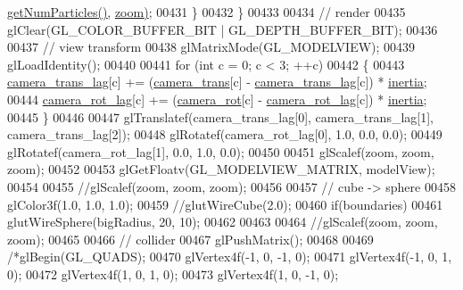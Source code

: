 \begin{DoxyCode}
{{{{{{{      \hyperlink{class_particle_system_a6f89e8d4c3e3e328088b7d652cee84b0}{getNumParticles}\hyperlink{class_particle_system_a6f89e8d4c3e3e328088b7d652cee84b0}{(}\hyperlink{class_particle_system_a6f89e8d4c3e3e328088b7d652cee84b0}{)}\hyperlink{class_particle_renderer_a396f73f6c16f24f34368557bfd5557e6}{,} \hyperlink{particles_8cpp_a3658355a3876ac7e7d318316fc9b0d21}{zoom}\hyperlink{class_particle_renderer_a396f73f6c16f24f34368557bfd5557e6}{)};
00431         \}
00432     \}
00433 
00434     \textcolor{comment}{// render}
00435     glClear(GL\_COLOR\_BUFFER\_BIT | GL\_DEPTH\_BUFFER\_BIT);
00436 
00437     \textcolor{comment}{// view transform}
00438     glMatrixMode(GL\_MODELVIEW);
00439     glLoadIdentity();
00440 
00441     \textcolor{keywordflow}{for} (\textcolor{keywordtype}{int} c = 0; c < 3; ++c)
00442     \{
00443         \hyperlink{particles_8cpp_a1475a0a4a9c24a5035d91125e5992afe}{camera\_trans\_lag}[c] += (\hyperlink{particles_8cpp_affab132fdfca08b149d2f866fd486ed4}{camera\_trans}[c] - 
      \hyperlink{particles_8cpp_a1475a0a4a9c24a5035d91125e5992afe}{camera\_trans\_lag}[c]) * \hyperlink{particles_8cpp_a639b27811b99d2487d6d94dd3c3b2a81}{inertia};
00444         \hyperlink{particles_8cpp_a2993bf9f16707b5c3ff46e0b751f0373}{camera\_rot\_lag}[c] += (\hyperlink{particles_8cpp_a9fcb578cacbd3a3b1ab593fc123cffb5}{camera\_rot}[c] - 
      \hyperlink{particles_8cpp_a2993bf9f16707b5c3ff46e0b751f0373}{camera\_rot\_lag}[c]) * \hyperlink{particles_8cpp_a639b27811b99d2487d6d94dd3c3b2a81}{inertia};
00445     \}
00446 
00447     glTranslatef(camera\_trans\_lag[0], camera\_trans\_lag[1], camera\_trans\_lag[2]);
00448     glRotatef(camera\_rot\_lag[0], 1.0, 0.0, 0.0);
00449     glRotatef(camera\_rot\_lag[1], 0.0, 1.0, 0.0);
00450 
00451         glScalef(zoom, zoom, zoom);
00452 
00453     glGetFloatv(GL\_MODELVIEW\_MATRIX, modelView);
00454 
00455         \textcolor{comment}{//glScalef(zoom, zoom, zoom);}
00456 
00457     \textcolor{comment}{// cube -> sphere}
00458     glColor3f(1.0, 1.0, 1.0);
00459     \textcolor{comment}{//glutWireCube(2.0);}
00460         \textcolor{keywordflow}{if}(boundaries)
00461         glutWireSphere(bigRadius, 20, 10);
00462 
00463 
00464         \textcolor{comment}{//glScalef(zoom, zoom, zoom);}
00465 
00466     \textcolor{comment}{// collider}
00467     glPushMatrix();
00468 
00469         \textcolor{comment}{/*glBegin(GL\_QUADS);}
00470 \textcolor{comment}{                glVertex4f(-1, 0, -1, 0);}
00471 \textcolor{comment}{                glVertex4f(-1, 0, 1, 0);}
00472 \textcolor{comment}{                glVertex4f(1, 0, 1, 0);}
00473 \textcolor{comment}{                glVertex4f(1, 0, -1, 0);}
}}}}}}}
\end{DoxyCode}
